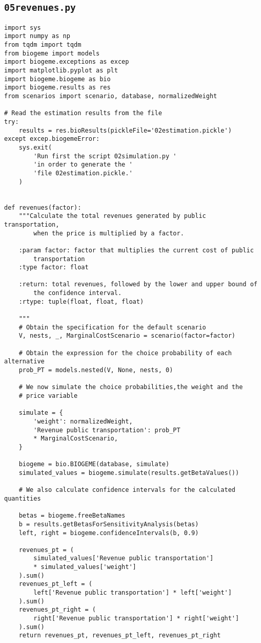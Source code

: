 \documentclass[12pt,a4paper]{article}
\begin{document}
\subsection{\lstinline$05revenues.py$}\label{sec:05revenues}
\begin{lstlisting}[style=numbers]
import sys
import numpy as np
from tqdm import tqdm
from biogeme import models
import biogeme.exceptions as excep
import matplotlib.pyplot as plt
import biogeme.biogeme as bio
import biogeme.results as res
from scenarios import scenario, database, normalizedWeight

# Read the estimation results from the file
try:
    results = res.bioResults(pickleFile='02estimation.pickle')
except excep.biogemeError:
    sys.exit(
        'Run first the script 02simulation.py '
        'in order to generate the '
        'file 02estimation.pickle.'
    )


def revenues(factor):
    """Calculate the total revenues generated by public transportation,
        when the price is multiplied by a factor.

    :param factor: factor that multiplies the current cost of public
        transportation
    :type factor: float

    :return: total revenues, followed by the lower and upper bound of
        the confidence interval.
    :rtype: tuple(float, float, float)

    """
    # Obtain the specification for the default scenario
    V, nests, _, MarginalCostScenario = scenario(factor=factor)

    # Obtain the expression for the choice probability of each alternative
    prob_PT = models.nested(V, None, nests, 0)

    # We now simulate the choice probabilities,the weight and the
    # price variable

    simulate = {
        'weight': normalizedWeight,
        'Revenue public transportation': prob_PT
        * MarginalCostScenario,
    }

    biogeme = bio.BIOGEME(database, simulate)
    simulated_values = biogeme.simulate(results.getBetaValues())

    # We also calculate confidence intervals for the calculated quantities

    betas = biogeme.freeBetaNames
    b = results.getBetasForSensitivityAnalysis(betas)
    left, right = biogeme.confidenceIntervals(b, 0.9)

    revenues_pt = (
        simulated_values['Revenue public transportation']
        * simulated_values['weight']
    ).sum()
    revenues_pt_left = (
        left['Revenue public transportation'] * left['weight']
    ).sum()
    revenues_pt_right = (
        right['Revenue public transportation'] * right['weight']
    ).sum()
    return revenues_pt, revenues_pt_left, revenues_pt_right



\end{lstlisting}
\end{document}
